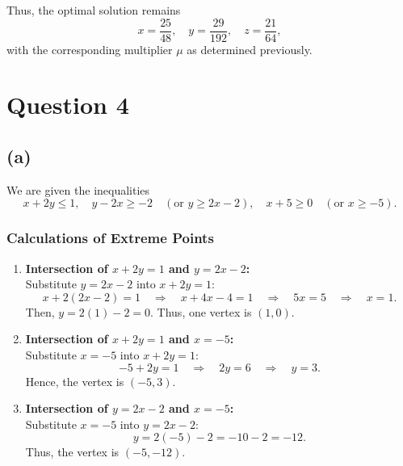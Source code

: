 \documentclass{article}
\begin{document}
Thus, the optimal solution remains
\[
\boxed{x=\frac{25}{48},\quad y=\frac{29}{192},\quad z=\frac{21}{64}},
\]
with the corresponding multiplier \(\mu\) as determined previously.

\section*{Question 4}
\subsection*{(a)}
We are given the inequalities
\[
x+2y \le 1,\quad y-2x \ge -2 \quad (\text{or } y\ge 2x-2),\quad x+5\ge0 \quad (\text{or } x\ge -5).
\]

\subsubsection*{Calculations of Extreme Points}
\begin{enumerate}
    \item \textbf{Intersection of \(x+2y=1\) and \(y=2x-2\):}\\
    Substitute \(y=2x-2\) into \(x+2y=1\):
    \[
    x+2(2x-2)=1\quad\Longrightarrow\quad x+4x-4=1\quad\Longrightarrow\quad 5x=5\quad\Longrightarrow\quad x=1.
    \]
    Then, \(y=2(1)-2=0\). Thus, one vertex is \((1,0)\).
    
    \item \textbf{Intersection of \(x+2y=1\) and \(x=-5\):}\\
    Substitute \(x=-5\) into \(x+2y=1\):
    \[
    -5+2y=1\quad\Longrightarrow\quad 2y=6\quad\Longrightarrow\quad y=3.
    \]
    Hence, the vertex is \((-5,3)\).
    
    \item \textbf{Intersection of \(y=2x-2\) and \(x=-5\):}\\
    Substitute \(x=-5\) into \(y=2x-2\):
    \[
    y=2(-5)-2=-10-2=-12.
    \]
    Thus, the vertex is \((-5,-12)\).
\end{enumerate}
\end{document}
